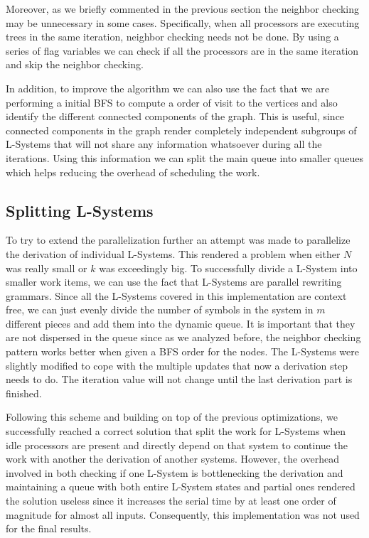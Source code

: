\documentclass[letterpaper,twoside,11pt]{article}
\begin{document}
\begin{multicols}{2}
Moreover, as we briefly commented in the previous section the neighbor checking may be unnecessary in some cases. Specifically, when all processors are executing trees in the same iteration, neighbor checking needs not be done. By using a series of flag variables we can check if all the processors are in the same iteration and skip the neighbor checking.

In addition, to improve  the algorithm we can also use the fact that we are performing a initial BFS to compute a order of visit to the vertices and also identify the different connected components of the graph. This is useful, since connected components in the graph render completely independent subgroups of L-Systems that will not share any information whatsoever during all the iterations. Using this information we can split the main queue into smaller queues which helps reducing the overhead of scheduling the work.


\subsection{Splitting L-Systems} %
\label{sub:splitting_l_systems}

To try to extend the parallelization further an attempt was made to parallelize the derivation of individual L-Systems. This rendered a problem when either $N$ was really small or $k$ was exceedingly big. To successfully divide a L-System into smaller work items, we can use the fact that L-Systems are parallel rewriting grammars. Since all the L-Systems covered in this implementation are context free, we can just evenly divide the number of symbols in the system in $m$ different pieces and add them into the dynamic queue. It is important that they are not dispersed in the queue since as we analyzed before, the neighbor checking pattern works better when given a BFS order for the nodes. The L-Systems were slightly modified to cope with the multiple updates that now a derivation step needs to do. The iteration value will not change until the last derivation part is finished.

Following this scheme and building on top of the previous optimizations, we successfully reached a correct solution that split the work for L-Systems when idle processors are present and directly depend on that system to continue the work with another the derivation of another systems. However, the overhead involved in both checking if one L-System is bottlenecking the derivation and maintaining a queue with both entire L-System states and partial ones rendered the solution useless since it increases the serial time by at least one order of magnitude for almost all inputs. Consequently, this implementation was not used for the final results.


\end{multicols}
\end{document}
